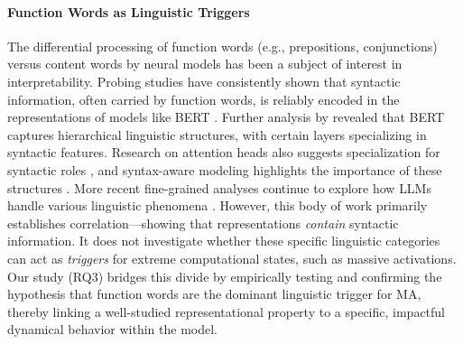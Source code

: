 \documentclass[conference]{IEEEtran}
\begin{document}
\paragraph{Function Words as Linguistic Triggers} The differential processing of function words (e.g., prepositions, conjunctions) versus content words by neural models has been a subject of interest in interpretability. Probing studies have consistently shown that syntactic information, often carried by function words, is reliably encoded in the representations of models like BERT \cite{hewitt2019structural, tenney2019bert}. Further analysis by \cite{jawahar2019what} revealed that BERT captures hierarchical linguistic structures, with certain layers specializing in syntactic features. Research on attention heads also suggests specialization for syntactic roles \cite{voita2019analyzing}, and syntax-aware modeling highlights the importance of these structures \cite{chiu2021syntax}. More recent fine-grained analyses continue to explore how LLMs handle various linguistic phenomena \cite{huang2023does}. However, this body of work primarily establishes correlation—showing that representations \textit{contain} syntactic information. It does not investigate whether these specific linguistic categories can act as \textit{triggers} for extreme computational states, such as massive activations. Our study (RQ3) bridges this divide by empirically testing and confirming the hypothesis that function words are the dominant linguistic trigger for MA, thereby linking a well-studied representational property to a specific, impactful dynamical behavior within the model.
\end{document}

